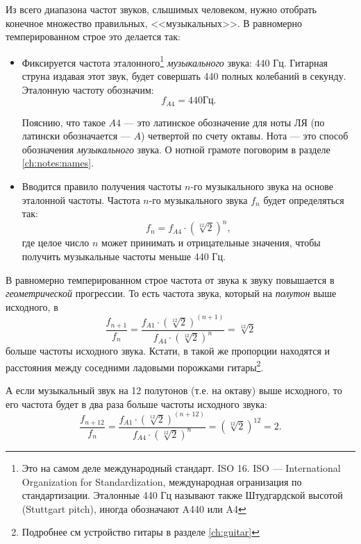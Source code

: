 Из всего диапазона частот звуков, слышимых человеком, нужно отобрать конечное множество правильных, <<музыкальных>>. В равномерно темперированном строе это делается так:
\begin{itemize}
    \item Фиксируется частота эталонного\footnote{Это на самом деле международный стандарт. ISO 16. ISO --- International Organization for Standardization, международная огранизация по стандартизации. Эталонные 440 Гц называют также Штудгардской высотой (Stuttgart pitch), иногда обозначают A440 или A4} \emph{музыкального} звука: 440 Гц. Гитарная струна издавая этот звук, будет совершать 440 полных колебаний в секунду. Эталонную частоту обозначим: 
    \[  
        f_{A4}=440\text{Гц}.
    \]
    
    Пояснию, что такое $A4$ --- это латинское обозначение для ноты ЛЯ (по латински обозначается --- $A$) четвертой по счету октавы. Нота --- это способ обозначения \emph{музыкального} звука. О нотной грамоте поговорим в разделе \ref{ch:notes:names}.
    
    \item Вводится правило получения частоты $n$-го музыкального звука на основе эталонной частоты. Частота $n$-го музыкального звука $f_n$ будет определяться так: 
    \begin{equation}
        f_n = f_{A4}\cdot({\sqrt[12]{2}})^n, \label{eq:music:tone:frequency}
    \end{equation}
    где целое число $n$ может принимать и отрицательные значения, чтобы получить музыкальные частоты меньше 440 Гц.
\end{itemize}

В равномерно темперированном строе частота от звука к звуку повышается в \emph{геометрической} прогрессии. То есть частота звука, который на \emph{полутон} выше исходного, в 
\[
    \frac{f_{n+1}}{f_n} = \frac{f_{A1}\cdot(\sqrt[12]{2})^{(n+1)}}{f_{A4}\cdot(\sqrt[12]{2})^n} = \sqrt[12]{2}
\] 
больше частоты исходного звука. Кстати, в такой же пропорции находятся и расстояния между соседними ладовыми порожками гитары\footnote{Подробнее см устройство гитары в разделе \ref{ch:guitar}}.

А если музыкальный звук на 12 полутонов (т.е. на октаву) выше исходного, то его частота будет в два раза больше частоты исходного звука:
\[
    \frac{f_{n+12}}{f_n} = \frac{f_{A1}\cdot(\sqrt[12]{2})^{(n+12)}}{f_{A4}\cdot(\sqrt[12]{2})^n} = (\sqrt[12]{2})^{12} = 2.
\]

